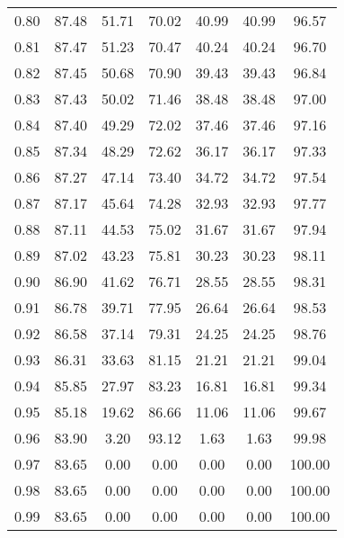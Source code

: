 \begin{tabular}{|c|c|c|c|c|c|c|}
      0.80 &     87.48 &     51.71 &      70.02 &   40.99 &      40.99 &         96.57 \\
      0.81 &     87.47 &     51.23 &      70.47 &   40.24 &      40.24 &         96.70 \\
      0.82 &     87.45 &     50.68 &      70.90 &   39.43 &      39.43 &         96.84 \\
      0.83 &     87.43 &     50.02 &      71.46 &   38.48 &      38.48 &         97.00 \\
      0.84 &     87.40 &     49.29 &      72.02 &   37.46 &      37.46 &         97.16 \\
      0.85 &     87.34 &     48.29 &      72.62 &   36.17 &      36.17 &         97.33 \\
      0.86 &     87.27 &     47.14 &      73.40 &   34.72 &      34.72 &         97.54 \\
      0.87 &     87.17 &     45.64 &      74.28 &   32.93 &      32.93 &         97.77 \\
      0.88 &     87.11 &     44.53 &      75.02 &   31.67 &      31.67 &         97.94 \\
      0.89 &     87.02 &     43.23 &      75.81 &   30.23 &      30.23 &         98.11 \\
      0.90 &     86.90 &     41.62 &      76.71 &   28.55 &      28.55 &         98.31 \\
      0.91 &     86.78 &     39.71 &      77.95 &   26.64 &      26.64 &         98.53 \\
      0.92 &     86.58 &     37.14 &      79.31 &   24.25 &      24.25 &         98.76 \\
      0.93 &     86.31 &     33.63 &      81.15 &   21.21 &      21.21 &         99.04 \\
      0.94 &     85.85 &     27.97 &      83.23 &   16.81 &      16.81 &         99.34 \\
      0.95 &     85.18 &     19.62 &      86.66 &   11.06 &      11.06 &         99.67 \\
      0.96 &     83.90 &      3.20 &      93.12 &    1.63 &       1.63 &         99.98 \\
      0.97 &     83.65 &      0.00 &       0.00 &    0.00 &       0.00 &        100.00 \\
      0.98 &     83.65 &      0.00 &       0.00 &    0.00 &       0.00 &        100.00 \\
      0.99 &     83.65 &      0.00 &       0.00 &    0.00 &       0.00 &        100.00 \\
\bottomrule
\end{tabular}
